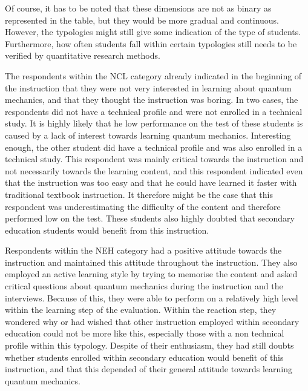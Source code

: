 \documentclass[11pt,twoside]{report} %
\begin{document}
Of course, it has to be noted that these dimensions are not as binary as represented in the table, but they would be more gradual and continuous. However, the typologies might still give some indication of the type of students. Furthermore, how often students fall within certain typologies still needs to be verified by quantitative research methods.


The respondents within the NCL category already indicated in the beginning of the instruction that they were not very interested in learning about quantum mechanics, and that they thought the instruction was boring. In two cases, the respondents did not have a technical profile and were not enrolled in a technical study. It is highly likely that he low performance on the test of these students is caused by a lack of interest towards learning quantum mechanics. Interesting enough, the other student did have a technical profile and was also enrolled in a technical study. This respondent was mainly critical towards the instruction and not necessarily towards the learning content, and this respondent indicated even that the instruction was too easy and that he could have learned it faster with traditional textbook instruction. It therefore might be the case that this respondent was underestimating the difficulty of the content and therefore performed low on the test. These students also highly doubted that secondary education students would benefit from this instruction.

Respondents within the NEH category had a positive attitude towards the instruction and maintained this attitude throughout the instruction. They also employed an active learning style by trying to memorise the content and asked critical questions about quantum mechanics during the instruction and the interviews. Because of this, they were able to perform on a relatively high level within the learning step of the evaluation. Within the reaction step, they wondered why or had wished that other instruction employed within secondary education could not be more like this, especially those with a non technical profile within this typology. Despite of their enthusiasm, they had still doubts whether students enrolled within secondary education would benefit of this instruction, and that this depended of their general attitude towards learning quantum mechanics.
\end{document}
